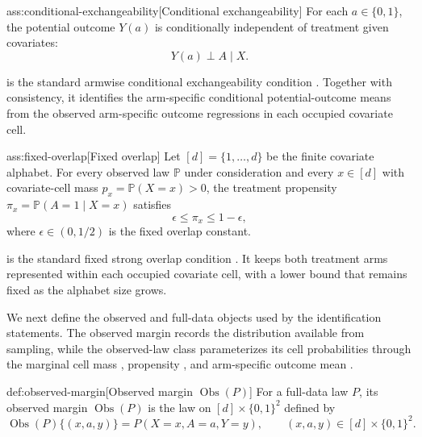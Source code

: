 \begin{assumptionv}{ass:conditional-exchangeability}[Conditional exchangeability]
For each \(a\in\{0,1\}\), the potential outcome \(Y(a)\) is conditionally independent of treatment given covariates:
\[
Y(a)\perp A\mid X .
\]
\end{assumptionv}

 is the standard armwise conditional exchangeability condition \citep{ZengBalakrishnanHanKennedy2024Discrete}. Together with consistency, it identifies the arm-specific conditional potential-outcome means from the observed arm-specific outcome regressions in each occupied covariate cell.

\begin{assumptionv}{ass:fixed-overlap}[Fixed overlap]
Let \([d]=\{1,\ldots,d\}\) be the finite covariate alphabet. For every observed law \(\mathbb P\) under consideration and every \(x\in[d]\) with covariate-cell mass \(p_x=\mathbb P(X=x)>0\), the treatment propensity \(\pi_x=\mathbb P(A=1\mid X=x)\) satisfies
\[
\epsilon\leq \pi_x \leq 1-\epsilon ,
\]
where \(\epsilon\in(0,1/2)\) is the fixed overlap constant.
\end{assumptionv}

 is the standard fixed strong overlap condition \citep{ZengBalakrishnanHanKennedy2024Discrete}. It keeps both treatment arms represented within each occupied covariate cell, with a lower bound that remains fixed as the alphabet size grows.

We next define the observed and full-data objects used by the identification statements. The observed margin records the distribution available from sampling, while the observed-law class parameterizes its cell probabilities through the marginal cell mass , propensity , and arm-specific outcome mean .

\begin{definitionv}{def:observed-margin}[Observed margin \(\operatorname{Obs}(P)\)]
For a full-data law \(P\), its observed margin \(\operatorname{Obs}(P)\) is the law on \([d]\times\{0,1\}^2\) defined by
\[
\operatorname{Obs}(P)\{(x,a,y)\}
=
P(X=x,A=a,Y=y),
\qquad
(x,a,y)\in[d]\times\{0,1\}^2.
\]
\end{definitionv}

